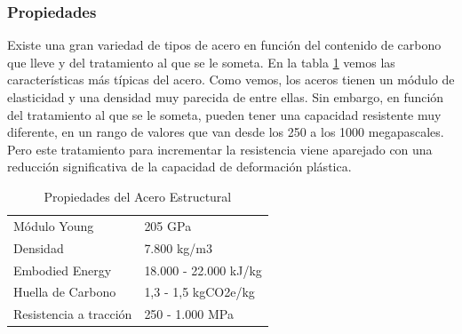 \subsubsection*{Propiedades}

Existe una gran variedad de tipos de acero en función del contenido de carbono que lleve y del tratamiento al que se le someta. En la tabla \ref{tab: Propiedades del Acero Estructural} vemos las características más típicas del acero. Como vemos, los aceros tienen un módulo de elasticidad y una densidad muy parecida de entre ellas. Sin embargo, en función del tratamiento al que se le someta, pueden tener una capacidad resistente muy diferente, en un rango de valores que van desde los 250 a los 1000 megapascales. Pero este tratamiento para incrementar la resistencia viene aparejado con una reducción significativa de la capacidad de deformación plástica.

\begin{table}
    \centering
    \caption{Propiedades del Acero Estructural}
    \label{tab: Propiedades del Acero Estructural}
    \begin{tabular}{| l | l |}
        \hline
        Módulo Young & 205 GPa \\
        Densidad & 7.800 kg/m3 \\
        Embodied Energy & 18.000 - 22.000 kJ/kg \\
        Huella de Carbono & 1,3 - 1,5 kgCO2e/kg \\
        Resistencia a tracción & 250 - 1.000 MPa \\
        \hline
    \end{tabular}
\end{table}


